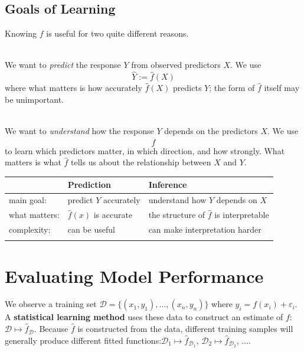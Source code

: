 \subsection{Goals of Learning}
Knowing $f$ is useful for two quite different reasons.
\begin{definition}[Prediction]\leavevmode \\
We want to \textit{predict} the response $Y$ from observed predictors $X$. We use
\begin{equation*}
    \hat{Y}:=\hat{f}(X)
\end{equation*}
where what matters is how accurately $\hat{f}(X)$ predicts $Y$; the form of $\hat{f}$ itself may be unimportant.
\end{definition}

\begin{definition}[Inference]\leavevmode \\
We want to \textit{understand} how the response $Y$ depends on the predictors $X$. We use
\begin{equation*}
    \hat{f}
\end{equation*}
to learn which predictors matter, in which direction, and how strongly. What matters is what $\hat{f}$ tells us about the relationship between $X$ and $Y$.
\end{definition}

\begin{table}[H]
\centering
\begin{tabular}{@{}l p{3.5cm} l@{}}
\toprule
 & Prediction & Inference\\
\midrule
main goal: & predict $Y$ accurately & understand how $Y$ depends on $X$\\
what matters: & $\hat{f}(x)$ is accurate & the structure of $\hat{f}$ is interpretable\\
complexity: & can be useful & can make interpretation harder\\
\botrule
\end{tabular}
\end{table}

\section{Evaluating Model Performance}
We observe a training set $\mathcal{D}=\{(x_1,y_1),\dots,(x_n,y_n)\}$ where $y_i=f(x_i)+\varepsilon_i$. A \textbf{statistical learning method} uses these data to construct an estimate of $f$: $\mathcal{D}\longmapsto \hat{f}_{\mathcal{D}}$. Because $\hat{f}$ is constructed from the data, different training samples will generally produce different fitted functions:$\mathcal{D}_1\longmapsto \hat{f}_{\mathcal{D}_1}$, $\mathcal{D}_2\longmapsto \hat{f}_{\mathcal{D}_2}$, $\dots$.

